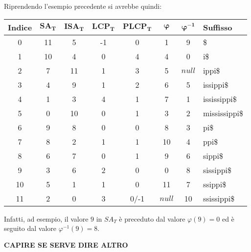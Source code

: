 \begin{esempio}
   Riprendendo l'esempio precedente si avrebbe quindi:
  \begin{table}[H]
    \centering
    \footnotesize
    \begin{tabular}{c|c|c|c|c|c|c|l} 
      \textbf{Indice} & $\mathbf{SA_T}$ & $\mathbf{ISA_T}$ & $\mathbf{LCP_T}$
      & $\mathbf{PLCP_T}$ & $\mathbf{\boldsymbol\varphi}$
      & $\mathbf{\boldsymbol\varphi^{-1}}$ & \textbf{Suffisso}\\  
      \hline
      0 & 11 & 5 & -1 & 0 & 1 & 9 & \$\\
      1 & 10 & 4 & 0 & 4 & 4 & 0 & i\$\\
      2 & 7 & 11 & 1 & 3 & 5 & $null$ & ippi\$\\
      3 & 4 & 9 & 1 & 2 & 6 & 5 & issippi\$\\
      4 & 1 & 3 & 4 & 1 & 7 & 1 & ississippi\$\\
      5 & 0 & 10 & 0 & 1 & 3 & 2 & mississippi\$\\
      6 & 9 & 8 & 0 & 0 & 8 & 3 & pi\$\\
      7 & 8 & 2 & 1 & 1 & 10 & 4 & ppi\$\\
      8 & 6 & 7 & 0 & 1 & 9 & 6 & sippi\$\\
      9 & 3 & 6 & 2 & 0 & 0 & 8 & sissippi\$\\
      10 & 5 & 1 & 1 & 0 & 11 & 7 & ssippi\$\\
      11 & 2 & 0 & 3 & 0/-1 & $null$ & 10 & ssissippi\$\\
    \end{tabular}
  \end{table}
  Infatti, ad esempio, il valore $9$ in $SA_T$ è preceduto dal valore
  $\varphi(9)=0$ ed è seguito dal valore $\varphi^{-1}(9)=8$.
\end{esempio}
\textbf{CAPIRE SE SERVE DIRE ALTRO}
